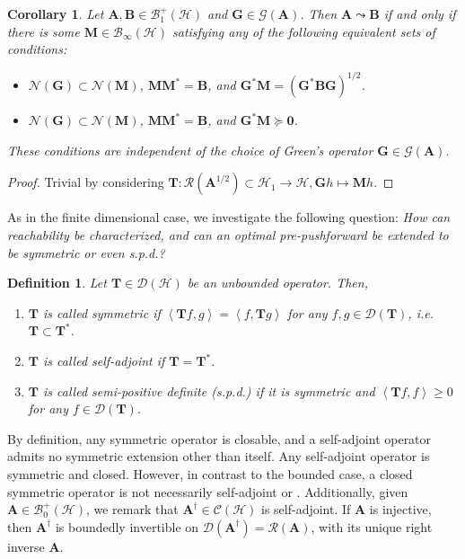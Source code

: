 \documentclass[noinfoline]{imsart}\setcounter{tocdepth}{2}
\newcommand{\m}[1]{\mathbf{#1}} %
\newcommand{\s}[1]{\mathscr{#1}} %
\renewcommand{\c}[1]{\mathcal{#1}} %
\newcommand{\innpr}[2]{{\left\langle {#1},{#2}\right\rangle}} %
\theoremstyle{plain}
\newtheorem{corollary}[theorem]{Corollary}
\newtheorem{definition}{Definition}[section]
\begin{document}
\begin{corollary}
Let $\m{A}, \m{B} \in \c{B}_{1}^{+}(\c{H})$ and $\m{G} \in \c{G}(\m{A})$. Then $\m{A} \leadsto \m{B}$ if and only if there is some $\m{M} \in \c{B}_{\infty}(\c{H})$ satisfying any of the following equivalent sets of conditions:
\begin{itemize}
    \item $\c{N}(\m{G}) \subset \c{N}(\m{M})$, $\m{M} \m{M}^{*} = \m{B}$, and $\m{G}^{*} \m{M} = (\m{G}^{*} \m{B} \m{G})^{1/2}$.
    \item $\c{N}(\m{G}) \subset \c{N}(\m{M})$, $\m{M} \m{M}^{*} = \m{B}$, and $\m{G}^{*} \m{M} \succeq \m{0}$.
\end{itemize}
These conditions are independent of the choice of Green's operator $\m{G} \in \s{G}(\m{A})$. 
\end{corollary}
\begin{proof}
Trivial by considering $\m{T}: \c{R}(\m{A}^{1/2}) \subset \c{H}_{1} \rightarrow \c{H}, \m{G} h \mapsto \m{M} h$.
\end{proof}

As in the finite dimensional case, we investigate the following question: \emph{How can reachability be characterized, and can an optimal pre-pushforward be extended to be symmetric or even s.p.d.?}

\begin{definition}
Let $\m{T} \in \c{D}(\c{H})$ be an unbounded operator. Then,
\begin{enumerate}[leftmargin = *]
    \item $\m{T}$ is called \emph{symmetric} if $\innpr{\m{T} f}{g} = \innpr{f}{\m{T} g}$ for any $f, g \in \c{D}(\m{T})$, i.e. $\m{T} \subset \m{T}^{*}$.
    \item $\m{T}$ is called \emph{self-adjoint} if $\m{T} = \m{T}^{*}$.
    \item $\m{T}$ is called \emph{semi-positive definite} (s.p.d.) if it is symmetric and $\innpr{\m{T} f}{f} \ge 0$ for any $f \in \c{D}(\m{T})$.
\end{enumerate}
\end{definition}

By definition, any symmetric operator is closable, and a self-adjoint operator admits no symmetric extension other than itself.
Any self-adjoint operator is symmetric and closed. However, in contrast to the bounded case, a closed symmetric operator is not necessarily self-adjoint \cite[Example X.1.12]{conway2019course} or \cite[Section 9.6]{hall2013quantum}. Additionally, given $\m{A} \in \c{B}_{0}^{+}(\c{H})$, we remark that $\m{A}^{\dagger} \in \c{C}(\c{H})$ is self-adjoint. If $\m{A}$ is injective, then $\m{A}^{\dagger}$ is boundedly invertible on $\c{D}(\m{A}^{\dagger}) = \c{R}(\m{A})$, with its unique right inverse $\m{A}$.
\end{document}
